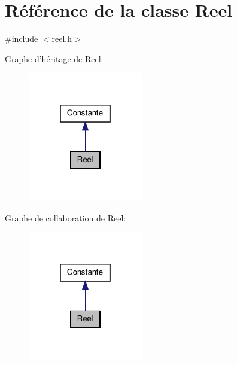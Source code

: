 \hypertarget{class_reel}{\section{\-Référence de la classe \-Reel}
\label{class_reel}
}


{\ttfamily \#include $<$reel.\-h$>$}



\-Graphe d'héritage de \-Reel\-:\nopagebreak
\begin{figure}[H]
\begin{center}
\leavevmode
\includegraphics[width=142pt]{class_reel__inherit__graph}
\end{center}
\end{figure}


\-Graphe de collaboration de \-Reel\-:\nopagebreak
\begin{figure}[H]
\begin{center}
\leavevmode
\includegraphics[width=142pt]{class_reel__coll__graph}
\end{center}
\end{figure}
